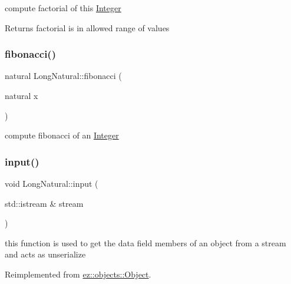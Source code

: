 compute factorial of this \hyperlink{classez_1_1objects_1_1Integer}{Integer} \begin{DoxyReturn}{Returns}
factorial is in allowed range of values 
\end{DoxyReturn}
\mbox{\label{classez_1_1objects_1_1LongNatural_a40705497507f5ba97adcbd4be3ee9c19}} 
\subsubsection{\texorpdfstring{fibonacci()}{fibonacci()}}
{\footnotesize\ttfamily natural Long\+Natural\+::fibonacci (\begin{DoxyParamCaption}\item[{natural}]{x }\end{DoxyParamCaption})\hspace{0.3cm}{\ttfamily [static]}}

compute fibonacci of an \hyperlink{classez_1_1objects_1_1Integer}{Integer} \mbox{\label{classez_1_1objects_1_1LongNatural_a37f51f88e9b039b5b59d0392ca03eeb0}} 
\subsubsection{\texorpdfstring{input()}{input()}}
{\footnotesize\ttfamily void Long\+Natural\+::input (\begin{DoxyParamCaption}\item[{std\+::istream \&}]{stream }\end{DoxyParamCaption})\hspace{0.3cm}{\ttfamily [virtual]}}

this function is used to get the data field members of an object from a stream and acts as unserialize 

Reimplemented from \hyperlink{classez_1_1objects_1_1Object_a878bdc53b7f16fda6fa15dab214c4b6a}{ez\+::objects\+::\+Object}.

\mbox{\label{classez_1_1objects_1_1LongNatural_a4cd663dc6f1eff09b83d19d76dd503cb}} 
